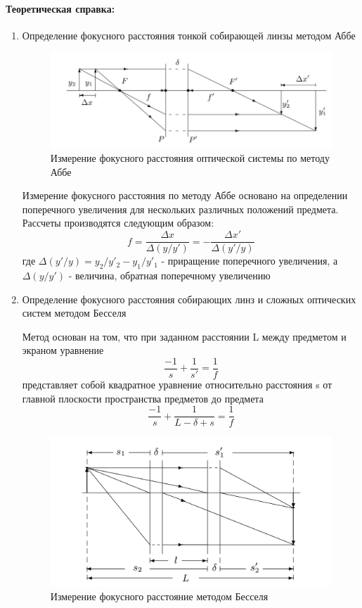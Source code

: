 \documentclass[a4paper,12pt]{article}
\begin{document}
\paragraph{Теоретическая справка:}
\begin{enumerate}
\item Определение фокусного расстояния тонкой собирающей линзы методом Аббе
\begin{figure}[h!]
\includegraphics[scale=1]{abbe.png} 
\caption{Измерение фокусного расстояния оптической системы по методу Аббе}
\end{figure}
Измерение фокусного расстояния по методу Аббе основано на определении поперечного увеличения для нескольких различных положений предмета. Рассчеты производятся следующим образом:
\begin{equation}
f = \frac{\Delta x}{\Delta(y/y')} = -\frac{\Delta x'}{\Delta (y'/y)}
\end{equation}
где $\Delta(y'/y)=y_2/y'_2-y_1/y'_1$ - приращение поперечного увеличения, а $\Delta(y/y')$ - величина, обратная поперечному увеличению
\item Определение фокусного расстояния собирающих линз и сложных оптических систем методом Бесселя

Метод основан на том, что при заданном расстоянии
L между предметом и экраном уравнение 
\begin{equation}
\frac{-1}{s}+\frac{1}{s'} = \frac{1}{f}
\end{equation}
 представляет собой
квадратное уравнение относительно расстояния s от главной плоскости пространства предметов до предмета
\begin{equation}
\frac{-1}{s}+\frac{1}{L-\delta +s} = \frac{1}{f}
\end{equation}
\begin{figure}[h!]
\centering
\includegraphics[scale=0.75]{besel.png} 
\caption{Измерение фокусного расстояние методом Бесселя}
\end{figure}


\end{enumerate}
\end{document}
